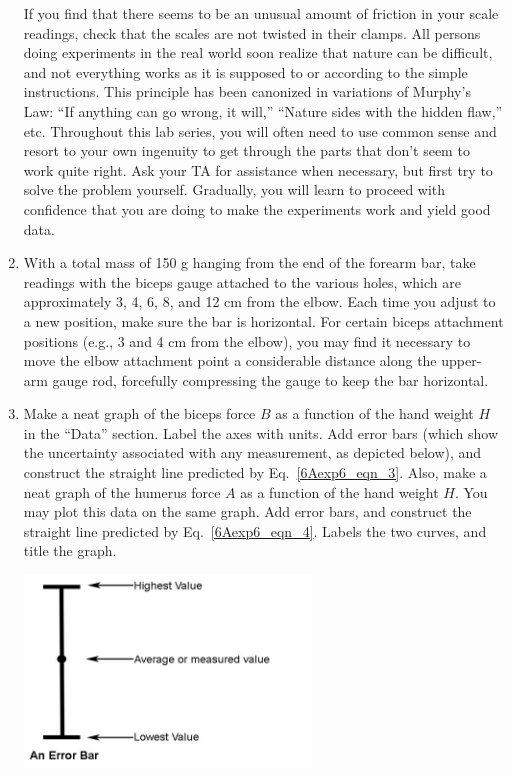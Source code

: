 \begin{enumerate}[label=\arabic*.]
If you find that there seems to be an unusual amount of friction in your scale readings, check that the scales are not twisted in their clamps.  All persons doing experiments in the real world soon realize that nature can be difficult, and not everything works as it is supposed to or according to the simple instructions.  This principle has been canonized in variations of Murphy's Law: ``If anything can go wrong, it will,'' ``Nature sides with the hidden flaw,'' etc.  Throughout this lab series, you will often need to use common sense and resort to your own ingenuity to get through the parts that don't seem to work quite right.  Ask your TA for assistance when necessary, but first try to solve the problem yourself.  Gradually, you will learn to proceed with confidence that you are doing to make the experiments work and yield good data.

\item With a total mass of 150 g hanging from the end of the forearm bar, take readings with the biceps gauge attached to the various holes, which are approximately 3, 4, 6, 8, and 12 cm from the elbow.  Each time you adjust to a new position, make sure the bar is horizontal.  For certain biceps attachment positions (e.g., 3 and 4 cm from the elbow), you may find it necessary to move the elbow attachment point a considerable distance along the upper-arm gauge rod, forcefully compressing the gauge to keep the bar horizontal.

\item Make a neat graph of the biceps force \(B\) as a function of the hand weight \(H\) in the ``Data'' section.  Label the axes with units.  Add error bars (which show the uncertainty associated with any measurement, as depicted below), and construct the straight line predicted by Eq.~\ref{6Aexp6_eqn_3}.  Also, make a neat graph of the humerus force \(A\) as a function of the hand weight \(H\).  You may plot this data on the same graph.  Add error bars, and construct the straight line predicted by Eq.~\ref{6Aexp6_eqn_4}.  Labels the two curves, and title the graph.
\begin{center} \includegraphics*[width=0.6\textwidth]{imgs/6labs/6Alab/6Aexp6/Error_bar_fixed.jpg} \end{center}


\end{enumerate}
